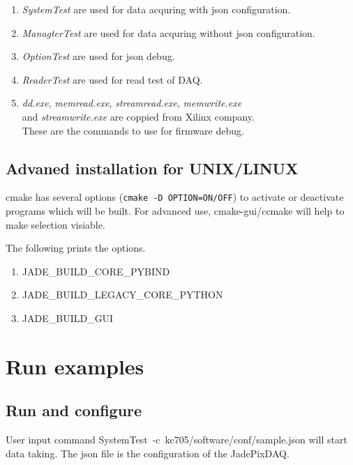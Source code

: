 \documentclass[12pt,a4paper]{article}
\begin{document}
\begin{enumerate}
	\item
	      \emph{SystemTest} are used for data acquring with json configuration.
	\item
	      \emph{ManagterTest} are used for data acquring without json configuration.
	\item
	      \emph{OptionTest} are used for json debug.
	\item
	      \emph{ReaderTest} are used for read test of DAQ.
	\item
	      \emph{dd.exe}, \emph{memread.exe}, \emph{streamread.exe}, \emph{memwrite.exe} \\
				and \emph{streamwrite.exe} are coppied from Xilinx company. \\ These are the commands 
				to use for firmware debug.
\end{enumerate}

\subsection{Advaned installation for UNIX/LINUX}
\label{advaned-installation-for-unixlinux}

cmake has several options (\texttt{cmake\ -D\ OPTION=ON/OFF}) to
activate or deactivate programs which will be built. For advanced use,
cmake-gui/ccmake will help to make selection visiable.

The following prints the options.

\begin{enumerate}
	\item
	      JADE\_BUILD\_CORE\_PYBIND
	\item
	      JADE\_BUILD\_LEGACY\_CORE\_PYTHON
	\item
	      JADE\_BUILD\_GUI
\end{enumerate}

\section{Run examples}
\label{run-examples}

\subsection{Run and configure}
\label{run-and-configure}

User input command SystemTest\ -c\ kc705/software/conf/sample.json will start data
taking. The json file is the configuration of the JadePixDAQ.
\end{document}
